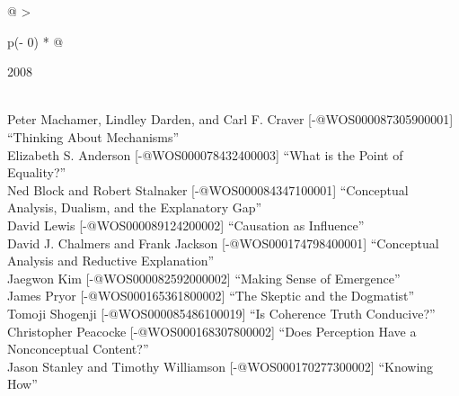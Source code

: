 \documentclass[
  10pt,
  letterpaper,
  DIV=11,
  numbers=noendperiod,
  twoside]{scrartcl}
\begin{document}
\begin{longtable}[]{@{}
  >{\raggedright\arraybackslash}p{(\columnwidth - 0\tabcolsep) * }@{}}

\caption{\label{tbl-top-ten-1999}Most cited articles published less than
ten years ago as of 2008.}

\tabularnewline

\toprule\noalign{}
\begin{minipage}[b]{\linewidth}\raggedright
2008
\end{minipage} \\
\midrule\noalign{}
\endhead
\bottomrule\noalign{}
\endlastfoot
Peter Machamer, Lindley Darden, and Carl F. Craver
{[}-@WOS000087305900001{]} ``Thinking About Mechanisms'' \\
Elizabeth S. Anderson {[}-@WOS000078432400003{]} ``What is the Point of
Equality?'' \\
Ned Block and Robert Stalnaker {[}-@WOS000084347100001{]} ``Conceptual
Analysis, Dualism, and the Explanatory Gap'' \\
David Lewis {[}-@WOS000089124200002{]} ``Causation as Influence'' \\
David J. Chalmers and Frank Jackson {[}-@WOS000174798400001{]}
``Conceptual Analysis and Reductive Explanation'' \\
Jaegwon Kim {[}-@WOS000082592000002{]} ``Making Sense of Emergence'' \\
James Pryor {[}-@WOS000165361800002{]} ``The Skeptic and the
Dogmatist'' \\
Tomoji Shogenji {[}-@WOS000085486100019{]} ``Is Coherence Truth
Conducive?'' \\
Christopher Peacocke {[}-@WOS000168307800002{]} ``Does Perception Have a
Nonconceptual Content?'' \\
Jason Stanley and Timothy Williamson {[}-@WOS000170277300002{]}
``Knowing How'' \\

\end{longtable}
\end{document}

